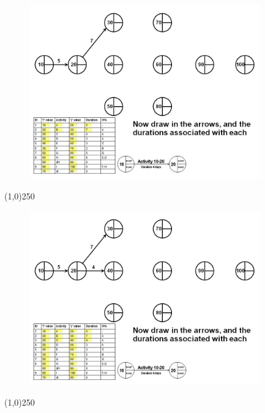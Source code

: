 \begin{frame}
\begin{figure}
	\centering
		\includegraphics[width = 10.0cm]{oldnotes/Slide92.jpg}
\end{figure}
\end{frame}
\begin{center}\line(1,0){250}\end{center}


\begin{frame}
\begin{figure}
	\centering
		\includegraphics[width = 10.0cm]{oldnotes/Slide93.jpg}
\end{figure}
\end{frame}
\begin{center}\line(1,0){250}\end{center}


